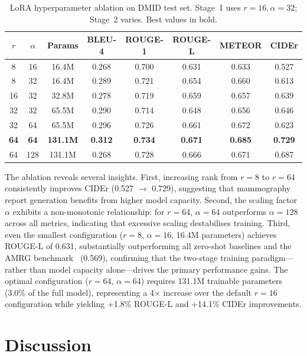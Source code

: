 \documentclass{wlscirep}
\begin{document}
\begin{table}[H]
\centering
\caption{LoRA hyperparameter ablation on DMID test set. Stage~1 uses $r=16, \alpha=32$; Stage~2 varies. Best values in bold.}
\label{tab:lora}
\begin{tabular}{cccccccc}
\toprule
$r$ & $\alpha$ & \textbf{Params} & \textbf{BLEU-4} & \textbf{ROUGE-1} & \textbf{ROUGE-L} & \textbf{METEOR} & \textbf{CIDEr} \\
\midrule
8  & 16  & 16.4M  & 0.268 & 0.700 & 0.631 & 0.633 & 0.527 \\
8  & 32  & 16.4M  & 0.289 & 0.721 & 0.654 & 0.660 & 0.613 \\
16 & 32  & 32.8M  & 0.278 & 0.719 & 0.659 & 0.657 & 0.639 \\
32 & 32  & 65.5M  & 0.290 & 0.714 & 0.648 & 0.656 & 0.646 \\
32 & 64  & 65.5M  & 0.296 & 0.726 & 0.661 & 0.672 & 0.623 \\
\textbf{64} & \textbf{64} & \textbf{131.1M} & \textbf{0.312} & \textbf{0.734} & \textbf{0.671} & \textbf{0.685} & \textbf{0.729} \\
64 & 128 & 131.1M & 0.268 & 0.728 & 0.666 & 0.671 & 0.687 \\
\bottomrule
\end{tabular}
\end{table}
The ablation reveals several insights. First, increasing rank from $r=8$ to $r=64$ consistently improves CIDEr (0.527 $\rightarrow$ 0.729), suggesting that mammography report generation benefits from higher model capacity. Second, the scaling factor $\alpha$ exhibits a non-monotonic relationship: for $r=64$, $\alpha=64$ outperforms $\alpha=128$ across all metrics, indicating that excessive scaling destabilises training. Third, even the smallest configuration ($r=8$, $\alpha=16$, 16.4M parameters) achieves ROUGE-L of 0.631, substantially outperforming all zero-shot baselines and the AMRG benchmark~\cite{sung2025} (0.569), confirming that the two-stage training paradigm---rather than model capacity alone---drives the primary performance gains. The optimal configuration ($r=64$, $\alpha=64$) requires 131.1M trainable parameters (3.0\% of the full model), representing a 4$\times$ increase over the default $r=16$ configuration while yielding +1.8\% ROUGE-L and +14.1\% CIDEr improvements.


\section*{Discussion}
\end{document}

